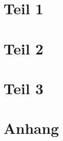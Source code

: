 \documentclass[
	a4paper,					%
	10pt,							%
	oneside,					%
	openright,				%
	notitlepage,			%
	parskip=half,			%
]{scrreprt}					%
\begin{document}
\tableofcontents
\listoffigures
\listoftables
\cleardoublepage


\part{Teil 1}
\label{part:teil1}
\onecolumn


\part{Teil 2}
\label{part:teil2}
\onecolumn


\part{Teil 3}
\label{part:teil3}
\onecolumn



\part{Anhang}
\label{part:anhang}
\onecolumn
\appendix
{}



\cleardoublepage
{} 
{}
\renewcommand{\glossaryname}{Glossar}
\printglossary

\cleardoublepage
{} 
{}

{}


\end{document}
